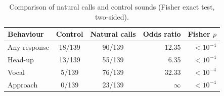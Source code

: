 \begin{table}[H]
\centering
\caption{Comparison of natural calls and control sounds (Fisher exact test, two-sided).}
\label{tab:p3fisher}
\small
\begin{tabular}{lccrr}
\toprule
Behaviour & Control & Natural calls & Odds ratio & Fisher $p$ \\
\midrule
Any response & 18/139 & 90/139 & 12.35 & $<10^{-4}$ \\
Head-up & 13/139 & 55/139 & 6.35 & $<10^{-4}$ \\
Vocal & 5/139 & 76/139 & 32.33 & $<10^{-4}$ \\
Approach & 0/139 & 23/139 & $\infty$ & $<10^{-4}$ \\
\bottomrule
\end{tabular}
\end{table}